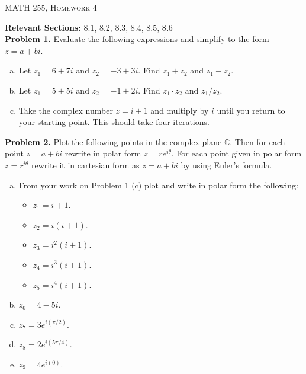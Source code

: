 \documentclass[12pt]{report} %
\newcommand{\C}{\mathbb{C}}
\theoremstyle{definition}
\begin{document}
\begin{center}
   \textsc{\large MATH 255, Homework 4}\\
\end{center}
\vspace{.5cm}

\noindent\textbf{Relevant Sections:} 8.1, 8.2, 8.3, 8.4, 8.5, 8.6 \\

\noindent\textbf{Problem 1.} Evaluate the following expressions and simplify to the form $z=a+bi$.
\begin{enumerate}[(a)]
    \item Let $z_1=6+7i$ and $z_2=-3+3i$.  Find $z_1+z_2$ and $z_1-z_2$.
    \item Let $z_1=5+5i$ and $z_2=-1+2i$.  Find $z_1\cdot z_2$ and $z_1/z_2$.
    \item Take the complex number $z=i+1$ and multiply by $i$ until you return to your starting point.  This should take four iterations.
\end{enumerate}
\vspace{.5cm}

\noindent\textbf{Problem 2.} Plot the following points in the complex plane $\C$.  Then for each point $z=a+bi$ rewrite in polar form $z=re^{i\theta}$. For each point given in polar form $z=r^{i\theta}$ rewrite it in cartesian form as $z=a+bi$ by using Euler's formula.
\begin{enumerate}[(a)]
    \item From your work on Problem 1 (c) plot and write in polar form the following:
    \begin{itemize}
        \item $z_1=i+1$.
        \item $z_2=i(i+1)$.
        \item $z_3=i^2(i+1)$.
        \item $z_4=i^3(i+1)$.
        \item $z_5=i^4(i+1)$.
    \end{itemize}
    \item $z_6=4-5i$.
    \item $z_7=3e^{i(\pi/2)}$.
    \item $z_8=2e^{i(5\pi/4)}$.
    \item $z_9=4e^{i(0)}$.
\end{enumerate}
\vspace{.5cm}
\end{document}
